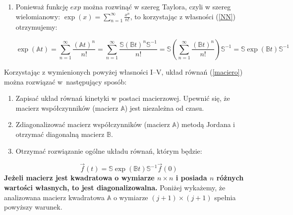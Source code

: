 \begin{enumerate}[label=\Roman*.]
	\begin{equation}
		\mathbb{A}^n = 
		\underbrace{
			\mathbb{S}\mathbb{B}\cancel{\mathbb{S}}^{-1}\cdot\cancel{\mathbb{S}}\mathbb{B}\cancel{\mathbb{S}}^{-1}\cdot\cdot\cdot \cancel{\mathbb{S}}\mathbb{B}\mathbb{S}^{-1}
		}_{n \ \mathrm{razy}}
		= \mathbb{S}\mathbb{B}^n\mathbb{S}^{-1}
		\label{NN}
	\end{equation}
	
	\item Ponieważ funkcję $exp$ można rozwinąć w szereg Taylora, czyli w szereg wielomianowy: $\exp(x)=\sum\limits_{n=1}^{\infty}\frac{x^n}{n!}$, to korzystając z własności (\ref{NN}) otrzymujemy:
	
	\begin{equation}
		\exp(\mathbb{A}t)=
		\sum\limits_{n=1}^{\infty}\frac{(\mathbb{A}t)^n}{n!}=
		\sum\limits_{n=1}^{\infty}\frac{\mathbb{S}(\mathbb{B}t)^n\mathbb{S}^{-1}}{n!}=
		\mathbb{S}\left(\sum\limits_{n=1}^{\infty}\frac{(\mathbb{B}t)^n}{n!}\right)\mathbb{S}^{-1}=
		\mathbb{S} \exp(\mathbb{B}t)\mathbb{S}^{-1}
		\label{wielo}
	\end{equation}
	
\end{enumerate}

\noindent Korzystając z wymienionych powyżej własności I--V, układ równań (\ref{maciero}) można rozwiązać w~następujący sposób:

\begin{enumerate}
	
	\item Zapisać układ równań kinetyki w postaci macierzowej. Upewnić się, że macierz współczynników (macierz $\mathbb{A}$) jest niezależna od czasu.
	
	\item Zdiagonalizować macierz współczynników (macierz $\mathbb{A}$) metodą Jordana i otrzymać diagonalną macierz $\mathbb{B}$.
	
	\item Otrzymać rozwiązanie ogólne układu równań, którym będzie:
\end{enumerate}
	\begin{equation}
		\vec{f}(t)=\mathbb{S}\exp(\mathbb{B}t)\mathbb{S}^{-1}\vec{f}(0)
		\label{rozwogolne}
	\end{equation}
	\textbf{Jeżeli macierz jest kwadratowa o wymiarze $n\times n$ i posiada $n$ różnych wartości własnych, to jest diagonalizowalna.}
	Poniżej wykażemy, że analizowana macierz kwadratowa $\mathbb{A}$ o wymiarze \mbox{$(j+1)\times (j+1)$} spełnia powyższy warunek.
	

